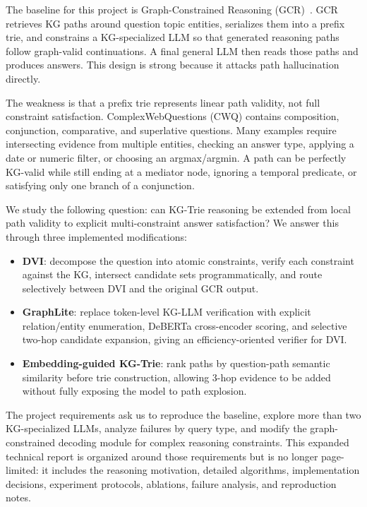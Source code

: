 \documentclass[10pt,twocolumn]{article}
\begin{document}
The baseline for this project is Graph-Constrained Reasoning (GCR)~\cite{luo2025gcr}. GCR retrieves KG paths around question topic entities, serializes them into a prefix trie, and constrains a KG-specialized LLM so that generated reasoning paths follow graph-valid continuations. A final general LLM then reads those paths and produces answers. This design is strong because it attacks path hallucination directly.

The weakness is that a prefix trie represents linear path validity, not full constraint satisfaction. ComplexWebQuestions (CWQ) contains composition, conjunction, comparative, and superlative questions. Many examples require intersecting evidence from multiple entities, checking an answer type, applying a date or numeric filter, or choosing an argmax/argmin. A path can be perfectly KG-valid while still ending at a mediator node, ignoring a temporal predicate, or satisfying only one branch of a conjunction.

We study the following question: can KG-Trie reasoning be extended from local path validity to explicit multi-constraint answer satisfaction? We answer this through three implemented modifications:
\begin{itemize}
  \item \textbf{DVI}: decompose the question into atomic constraints, verify each constraint against the KG, intersect candidate sets programmatically, and route selectively between DVI and the original GCR output.
  \item \textbf{GraphLite}: replace token-level KG-LLM verification with explicit relation/entity enumeration, DeBERTa cross-encoder scoring, and selective two-hop candidate expansion, giving an efficiency-oriented verifier for DVI.
  \item \textbf{Embedding-guided KG-Trie}: rank paths by question-path semantic similarity before trie construction, allowing 3-hop evidence to be added without fully exposing the model to path explosion.
\end{itemize}

The project requirements ask us to reproduce the baseline, explore more than two KG-specialized LLMs, analyze failures by query type, and modify the graph-constrained decoding module for complex reasoning constraints. This expanded technical report is organized around those requirements but is no longer page-limited: it includes the reasoning motivation, detailed algorithms, implementation decisions, experiment protocols, ablations, failure analysis, and reproduction notes.
\end{document}
